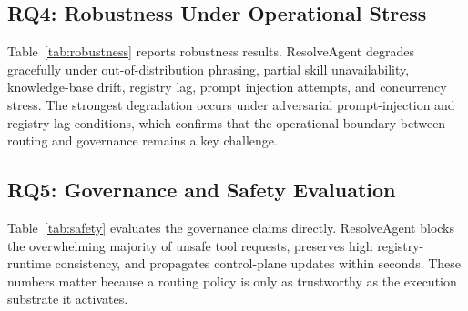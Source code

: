 \documentclass[conference]{IEEEtran}
\begin{document}
\subsection{RQ4: Robustness Under Operational Stress}
Table~\ref{tab:robustness} reports robustness results. ResolveAgent degrades gracefully under out-of-distribution phrasing, partial skill unavailability, knowledge-base drift, registry lag, prompt injection attempts, and concurrency stress. The strongest degradation occurs under adversarial prompt-injection and registry-lag conditions, which confirms that the operational boundary between routing and governance remains a key challenge.

\begin{table}[t]
\centering
\caption{Robustness under operational stress conditions. Unsafe block rate denotes the percentage of disallowed actions correctly prevented by policy.}
\label{tab:robustness}
\end{table}

\subsection{RQ5: Governance and Safety Evaluation}
Table~\ref{tab:safety} evaluates the governance claims directly. ResolveAgent blocks the overwhelming majority of unsafe tool requests, preserves high registry-runtime consistency, and propagates control-plane updates within seconds. These numbers matter because a routing policy is only as trustworthy as the execution substrate it activates.
\end{document}
